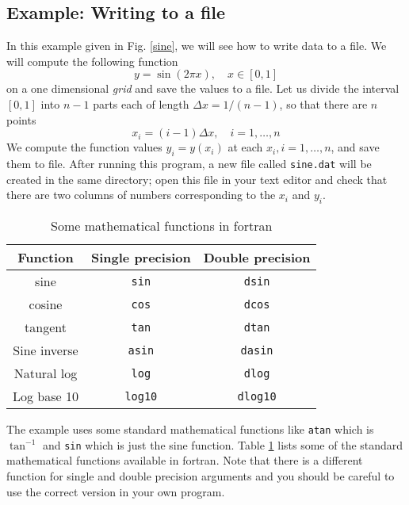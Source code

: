 \documentclass[11pt,oneside]{amsart}
\begin{document}
\subsection{Example: Writing to a file}

In this example given in Fig. \ref{sine}, we will see how to write data to a file. We will compute the following function
\begin{equation*}
y = \sin(2 \pi x), \quad x \in [0,1]
\end{equation*}
on a one dimensional {\em grid} and save the values to a file. Let us divide the interval $[0,1]$ into $n-1$ parts each of length $\Delta x = 1/(n-1)$, so that there are $n$ points
\begin{equation}
x_i = (i-1) \Delta x, \quad i=1,\ldots,n
\end{equation}
We compute the function values $y_i = y(x_i)$ at each $x_i, i=1,\ldots,n$, and save them to file. After running this program, a new file called {\tt sine.dat} will be created in the same directory; open this file in your text editor and check that there are two columns of numbers corresponding to the $x_i$ and $y_i$.

\begin{table}[htp]
\caption{Some mathematical functions in fortran}
\begin{center}
\begin{tabular}{|c|c|c|}
\hline
Function & Single precision & Double precision \\
\hline
sine & {\tt sin} & {\tt dsin} \\
\hline
cosine & {\tt cos} & {\tt dcos} \\
\hline
tangent & {\tt tan} & {\tt dtan} \\
\hline
Sine inverse & {\tt asin} & {\tt dasin} \\
\hline
Natural log & {\tt log} & {\tt dlog} \\
\hline
Log base 10 & {\tt log10} & {\tt dlog10} \\
\hline
\end{tabular}
\end{center}
\label{tab:math}
\end{table}%

The example uses some standard mathematical functions like {\tt atan} which is $\tan^{-1}$ and {\tt sin} which is just the sine function. Table \ref{tab:math} lists some of the standard mathematical functions available in fortran. Note that there is a different function for single and double precision arguments and you should be careful to use the correct version in your own program.
\end{document}
